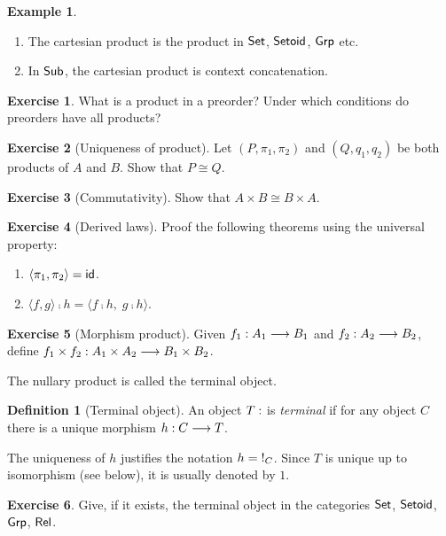 \documentclass[a4paper,fleqn]{scrartcl}
\theoremstyle{definition}
\newtheorem{definition}{Definition}
\newtheorem{example}{Example}
\newtheorem{exercise}{Exercise}
\let\C\relax %
\newcommand{\C}{\mathcal{C}}
\begin{document}
\begin{example}\bla
  \begin{enumerate}
  \item The cartesian product is the product in $\Set$, $\Setoid$,
    $\Grp$ etc.
  \item In $\Sub$, the cartesian product is context concatenation.
  \end{enumerate}
\end{example}
\begin{exercise}
  What is a product in a preorder?
  Under which conditions do preorders have all products?
\end{exercise}
\begin{exercise}[Uniqueness of product]
  Let $(P,\pi_1,\pi_2)$ and $(Q,q_1,q_2)$ be both products of $A$ and
  $B$.  Show that $P \cong Q$.
\end{exercise}
\begin{exercise}[Commutativity]
  Show that $A \times B \cong B \times A$.
\end{exercise}
\begin{exercise}[Derived laws]
  Proof the following theorems using the universal property:
  \begin{enumerate}
  \item $\langle \pi_1,\pi_2 \rangle = \tid$.
  \item $\langle f,g \rangle \comp h = \langle f \comp h,\; g \comp h \rangle$.
  \end{enumerate}
\end{exercise}
\begin{exercise}[Morphism product]
  \label{ex:hom-product}
  Given $f_1 : A_1 \too B_1$ and $f_2 : A_2 \too B_2$, define $f_1
  \times f_2 : A_1 \times A_2 \too B_1 \times B_2$.
\end{exercise}

The nullary product is called the terminal object.
\begin{definition}[Terminal object]
  An object $T : \C$ is \emph{terminal} if for any object $C$ there is
  a unique morphism $h : C \too T$.

  The uniqueness of $h$ justifies the notation $h = \bang[C]$.
  Since $T$ is unique up to isomorphism (see below), it is usually
  denoted by $1$.
\end{definition}
\begin{exercise}
  Give, if it exists, the terminal object in the categories $\Set$,
  $\Setoid$, $\Grp$, $\Rel$.
\end{exercise}
\end{document}
